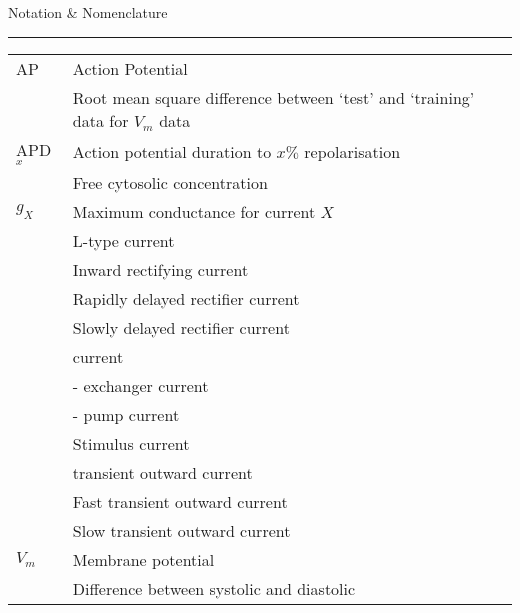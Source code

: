 \documentclass[../thesis-main.tex]{subfiles}
\begin{document}
 \vspace*{10mm}
 {
  \Large\em
  \begin{flushright}
   Notation \& Nomenclature
  \end{flushright}
  \rule{\linewidth}{0.25mm}
 }
 \label{sec:Notation}
 
 \begin{tabular}{p{2.5cm}p{10cm}}
  AP		& Action Potential \\
  \aprms	& Root mean square difference between `test' and `training' data for $V_m$ data \\
  APD$_x$	& Action potential duration to $x\%$ repolarisation \\
  \cai		& Free cytosolic \ca{} concentration \\
  $g_X$		& Maximum conductance for current $X$ \\
  \ica		& L-type \ca{} current \\
  \ikix		& Inward rectifying \K{} current \\
  \ikr		& Rapidly delayed rectifier \K{} current \\
  \iks		& Slowly delayed rectifier \K{} current \\
  \ina		& \na{} current \\
  \inaca	& \na{}-\ca{} exchanger current \\
  \inak		& \na{}-\K{} pump current \\
  \istim	& Stimulus current \\
  \ito		& \K{} transient outward current \\
  \itof		& Fast \K{} transient outward current \\
  \itos		& Slow \K{} transient outward current \\
  $V_m$		& Membrane potential \\
  \catrans	& Difference between systolic \cai{} and diastolic \cai{} \\
 \end{tabular}
\end{document}
